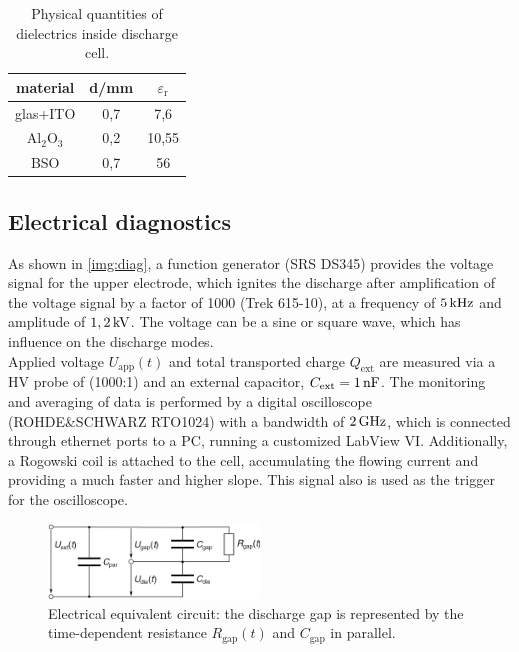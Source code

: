 \documentclass[a4paper,10pt,twoside]{article}
\newcommand{\ix}[1]{_\text{#1}}
\begin{document}
				\begin{table}[h]
					\centering
					\begin{tabular}{c|c|c}
						material & d/mm & $\varepsilon\ix{r}$ \\
						\hline \hline glas+ITO & 0,7 & 7,6 \\
						\hline Al$\ix{2}$O$\ix{3}$ & 0,2 & 10,55 \\
						\hline BSO & 0,7 & 56 \\
					\end{tabular}
					\caption{Physical quantities of dielectrics inside discharge cell.}
					\label{tab:permits}
				\end{table}

		\subsection{Electrical diagnostics}\label{subsec:electric}
				
			 As shown in \autoref{img:diag}, a function generator (SRS DS345) provides the voltage signal for the upper electrode, which ignites the discharge after amplification of the voltage signal by a factor of 1000 (Trek 615-10), at a frequency of $\unit[5]{kHz}$ and amplitude of $\unit[1,2]{kV}$. The voltage can be a sine or square wave, which has influence on the discharge modes.\\
			 Applied voltage $U\ix{app}(t)$ and total transported charge $Q\ix{ext}$ are measured via a HV probe of (1000:1) and an external capacitor, $C\ix{ext}=\unit[1]{nF}$. The monitoring and averaging of data is performed by a digital oscilloscope (ROHDE\&SCHWARZ RTO1024) with a bandwidth of $\unit[2]{GHz}$, which is connected through ethernet ports to a PC, running a customized LabView VI. Additionally, a Rogowski coil is attached to the cell, accumulating the flowing current and providing a much faster and higher slope. This signal also is used as the trigger for the oscilloscope.
			 
 				\begin{figure}[t!]
 					\centering
 					\hspace{-0.2cm}\includegraphics[width=0.5\textwidth]{figures/setup/replacementcircuit.pdf}
 					\caption{Electrical equivalent circuit: the discharge gap is represented by the time-dependent resistance $R\ix{gap}(t)$ and $C\ix{gap}$ in parallel.}
 					\label{img:circuit}
 				\end{figure}
			 
\end{document}

